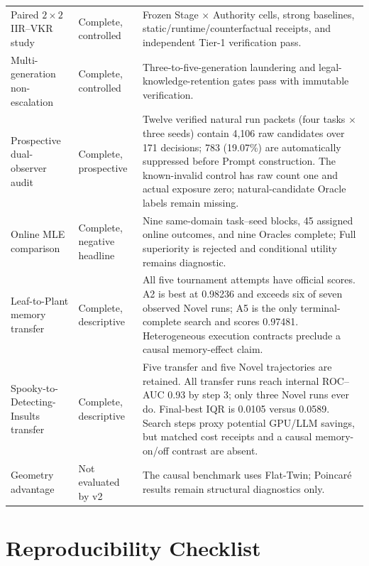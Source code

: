 \documentclass{article}
\begin{document}
\begin{table}[h]
\begin{tabular}{p{}p{}p{}}
Paired $2\times2$ IIR--VKR study & Complete, controlled & Frozen Stage $\times$ Authority cells, strong baselines, static/runtime/counterfactual receipts, and independent Tier-1 verification pass. \\
Multi-generation non-escalation & Complete, controlled & Three-to-five-generation laundering and legal-knowledge-retention gates pass with immutable verification. \\
Prospective dual-observer audit & Complete, prospective & Twelve verified natural run packets (four tasks $\times$ three seeds) contain 4,106 raw candidates over 171 decisions; 783 (19.07\%) are automatically suppressed before Prompt construction.  The known-invalid control has raw count one and actual exposure zero; natural-candidate Oracle labels remain missing. \\
Online MLE comparison & Complete, negative headline & Nine same-domain task--seed blocks, 45 assigned online outcomes, and nine Oracles complete; Full superiority is rejected and conditional utility remains diagnostic. \\
Leaf-to-Plant memory transfer & Complete, descriptive & All five tournament attempts have official scores.  A2 is best at 0.98236 and exceeds six of seven observed Novel runs; A5 is the only terminal-complete search and scores 0.97481.  Heterogeneous execution contracts preclude a causal memory-effect claim. \\
Spooky-to-Detecting-Insults transfer & Complete, descriptive & Five transfer and five Novel trajectories are retained.  All transfer runs reach internal ROC--AUC 0.93 by step 3; only three Novel runs ever do.  Final-best IQR is 0.0105 versus 0.0589.  Search steps proxy potential GPU/LLM savings, but matched cost receipts and a causal memory-on/off contrast are absent. \\
Geometry advantage & Not evaluated by v2 & The causal benchmark uses Flat-Twin; Poincar\'e results remain structural diagnostics only. \\
\bottomrule
\end{tabular}
\end{table}
\FloatBarrier

\section{Reproducibility Checklist}
\end{document}
